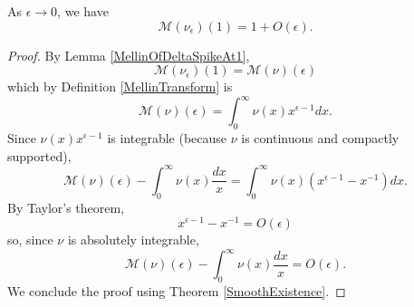 \begin{lemma}
\label{MellinOfDeltaSpikeAt1_asymp}
\leanok
As $\epsilon\to 0$, we have
  $$\mathcal{M}(\nu_\epsilon)(1) = 1+O(\epsilon).$$
\end{lemma}
\begin{proof}
\leanok
By Lemma \ref{MellinOfDeltaSpikeAt1},
  $$
    \mathcal M(\nu_\epsilon)(1)=\mathcal M(\nu)(\epsilon)
  $$
  which by Definition \ref{MellinTransform} is
  $$
    \mathcal M(\nu)(\epsilon)=\int_0^\infty\nu(x)x^{\epsilon-1}dx
    .
  $$
  Since $\nu(x) x^{\epsilon-1}$ is integrable (because $\nu$ is continuous and compactly
  supported),
  $$
    \mathcal M(\nu)(\epsilon)-\int_0^\infty\nu(x)\frac{dx}x
    =\int_0^\infty\nu(x)(x^{\epsilon-1}-x^{-1})dx
    .
  $$
  By Taylor's theorem,
  $$
    x^{\epsilon-1}-x^{-1}=O(\epsilon)
  $$
  so, since $\nu$ is absolutely integrable,
  $$
    \mathcal M(\nu)(\epsilon)-\int_0^\infty\nu(x)\frac{dx}x=O(\epsilon)
    .
  $$
  We conclude the proof using Theorem \ref{SmoothExistence}.
\end{proof}
